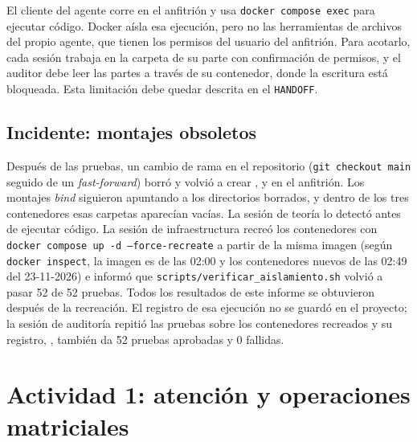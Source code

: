 \documentclass[10pt]{article}
\begin{document}
El cliente del agente corre en el anfitrión y usa \texttt{docker compose exec} para ejecutar código.
Docker aísla esa ejecución, pero no las herramientas de archivos del propio agente, que tienen los
permisos del usuario del anfitrión. Para acotarlo, cada sesión trabaja en la carpeta de su parte con
confirmación de permisos, y el auditor debe leer las partes a través de su contenedor, donde la
escritura está bloqueada. Esta limitación debe quedar descrita en el \texttt{HANDOFF}.

\subsection{Incidente: montajes obsoletos}\label{sec:incidente}
Después de las pruebas, un cambio de rama en el repositorio (\texttt{git checkout main} seguido de
un \emph{fast-forward}) borró y volvió a crear ,  y  en
el anfitrión. Los montajes \emph{bind} siguieron apuntando a los directorios borrados, y dentro de
los tres contenedores esas carpetas aparecían vacías. La sesión de teoría lo detectó antes de
ejecutar código. La sesión de infraestructura recreó los contenedores con
\texttt{docker compose up -d --force-recreate} a partir de la misma imagen (según
\texttt{docker inspect}, la imagen es de las 02:00 y los contenedores nuevos de las 02:49 del
23-11-2026) e informó que \texttt{scripts/verificar\_aislamiento.sh} volvió a pasar 52 de 52 pruebas.
Todos los resultados de este informe se obtuvieron después de la recreación. El registro de esa
ejecución no se guardó en el proyecto; la sesión de auditoría repitió las pruebas sobre los
contenedores recreados y su registro, ,
también da 52 pruebas aprobadas y 0 fallidas.

\section{Actividad 1: atención y operaciones matriciales}
\end{document}
